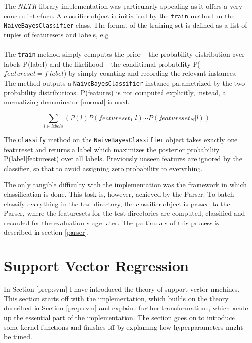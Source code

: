 \documentclass[12pt,notitlepage,twoside]{scrreprt}
\begin{document}
The \textit{NLTK} library implementation was particularly appealing as it offers a very
concise interface. A classifier object is initialised by the \texttt{train}
method on the \texttt{NaiveBayesClassifier} class. The format of the training
set is defined as a list of tuples of featuresets and labels, e.g.
\begin{gather*}
[(featureset_1, label_1), \cdots, (featureset_N,
label_N)]
\end{gather*}

The \texttt{train} method simply computes the prior -- the probability
distribution over labels P(label) and the likelihood -- the conditional
probability P(\(featureset=f|label\)) by simply counting and recording the
relevant instances. The method outputs a \texttt{NaiveBayesClassifier} instance
parametrized by the two probability distributions. P(features) is not
computed explicitly, instead, a normalizing denominator \ref{normal} is used.

\begin{equation} \sum_{l \in labels}(P(l)P(featureset_1|l)\cdots
  P(featureset_N|l)) \end{equation}

The \texttt{classify} method on the \texttt{NaiveBayesClassifier} object takes
exactly one featureset and returns a label which maximizes the posterior
probability P(label|featureset) over all labels.  Previously unseen features
are ignored by the classifier, so that to avoid assigning zero probability to
everything.

The only tangible difficulty with the implementation was the
framework in which classification is done. This task is, however, achieved by
the Parser.  To batch classify everything in the test directory, the classifier
object is passed to the Parser, where the featuresets for the test directories
are computed, classified and recorded for the evaluation stage later. The
particulars of this process is described in section \ref{parser}.

\section{Support Vector Regression}
\label{sec:svm}
In Section \ref{prep:svm} I have introduced the theory of support vector machines.  This
section starts off with the implementation, which builds on the theory described in
Section \ref{prep:svm} and explains further transformations, which made up the essential
part of the implementation. The section goes on to introduce some kernel functions and
finishes off by explaining how hyperparameters might be tuned.
\end{document}
